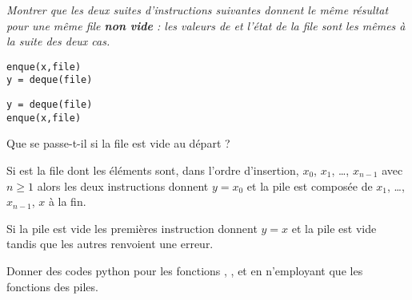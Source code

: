 \begin{Exercise}[title = {Commutativité}]\it
Montrer que les deux suites d'instructions suivantes donnent le même résultat pour une même file {\bf non vide} : les valeurs de  et l'état de la file  sont les mêmes à la suite des deux cas.
{\rm 
\begin{lstlisting}
enque(x,file)
y = deque(file)
\end{lstlisting}

\begin{lstlisting}
y = deque(file)
enque(x,file)
\end{lstlisting}}

Que se passe-t-il si la file est vide au départ ?
\end{Exercise} 
\begin{Answer}
Si  est la file dont les éléments sont, dans l'ordre d'insertion, $x_0$, $x_1$, \dots, $x_{n-1}$ avec $n\ge 1$ alors les deux instructions donnent $y = x_0$ et la pile est composée de $x_1$, \dots, $x_{n-1}$, $x$ à la fin.

Si la pile est vide les premières instruction donnent $y=x$ et la pile est vide tandis que les autres renvoient une erreur.
\end{Answer}
\begin{Exercise}[title = {Implémentations d'une file à l'aide de deux piles}]\it

Donner des codes python pour les fonctions  ,  ,   et  en n'employant que les fonctions des piles.
\end{Exercise} 
